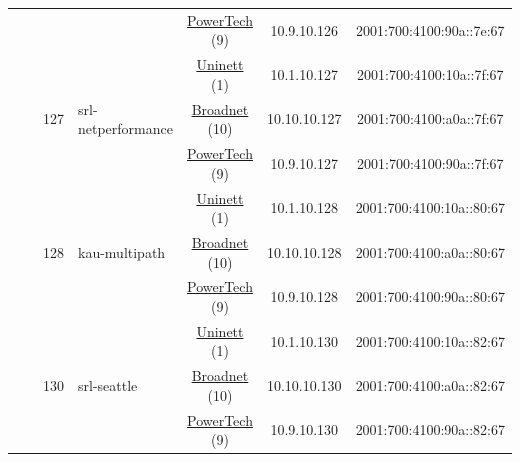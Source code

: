 \begin{small}
\begin{center}
\begin{longtable}{|c|c|c|c|c|c|c|c|}
  &  &  &  & \multicolumn{2}{|c|}{\tiny{\href{http://www.powertech.no}{PowerTech} (9)}} & \tiny{10.9.10.126} & \tiny{2001:700:4100:90a::7e:67} \\* \cline{3-3}\cline{4-4}\cline{5-5}\cline{6-6}\cline{7-7}\cline{8-8}
  &  & \multirow{3}{*}{\tiny{127}} & \multicolumn{1}{|l|}{\multirow{3}{*}{\tiny{srl-netperformance}}} & \multicolumn{2}{|c|}{\tiny{\href{https://www.uninett.no}{Uninett} (1)}} & \tiny{10.1.10.127} & \tiny{2001:700:4100:10a::7f:67} \\* \cline{5-5}\cline{6-6}\cline{7-7}\cline{8-8}
  &  &  &  & \multicolumn{2}{|c|}{\tiny{\href{https://www.broadnet.no}{Broadnet} (10)}} & \tiny{10.10.10.127} & \tiny{2001:700:4100:a0a::7f:67} \\* \cline{5-5}\cline{6-6}\cline{7-7}\cline{8-8}
  &  &  &  & \multicolumn{2}{|c|}{\tiny{\href{http://www.powertech.no}{PowerTech} (9)}} & \tiny{10.9.10.127} & \tiny{2001:700:4100:90a::7f:67} \\* \cline{3-3}\cline{4-4}\cline{5-5}\cline{6-6}\cline{7-7}\cline{8-8}
  &  & \multirow{3}{*}{\tiny{128}} & \multicolumn{1}{|l|}{\multirow{3}{*}{\tiny{kau-multipath}}} & \multicolumn{2}{|c|}{\tiny{\href{https://www.uninett.no}{Uninett} (1)}} & \tiny{10.1.10.128} & \tiny{2001:700:4100:10a::80:67} \\* \cline{5-5}\cline{6-6}\cline{7-7}\cline{8-8}
  &  &  &  & \multicolumn{2}{|c|}{\tiny{\href{https://www.broadnet.no}{Broadnet} (10)}} & \tiny{10.10.10.128} & \tiny{2001:700:4100:a0a::80:67} \\* \cline{5-5}\cline{6-6}\cline{7-7}\cline{8-8}
  &  &  &  & \multicolumn{2}{|c|}{\tiny{\href{http://www.powertech.no}{PowerTech} (9)}} & \tiny{10.9.10.128} & \tiny{2001:700:4100:90a::80:67} \\* \cline{3-3}\cline{4-4}\cline{5-5}\cline{6-6}\cline{7-7}\cline{8-8}
  &  & \multirow{3}{*}{\tiny{130}} & \multicolumn{1}{|l|}{\multirow{3}{*}{\tiny{srl-seattle}}} & \multicolumn{2}{|c|}{\tiny{\href{https://www.uninett.no}{Uninett} (1)}} & \tiny{10.1.10.130} & \tiny{2001:700:4100:10a::82:67} \\* \cline{5-5}\cline{6-6}\cline{7-7}\cline{8-8}
  &  &  &  & \multicolumn{2}{|c|}{\tiny{\href{https://www.broadnet.no}{Broadnet} (10)}} & \tiny{10.10.10.130} & \tiny{2001:700:4100:a0a::82:67} \\* \cline{5-5}\cline{6-6}\cline{7-7}\cline{8-8}
  &  &  &  & \multicolumn{2}{|c|}{\tiny{\href{http://www.powertech.no}{PowerTech} (9)}} & \tiny{10.9.10.130} & \tiny{2001:700:4100:90a::82:67} \\* \cline{3-3}\cline{4-4}\cline{5-5}\cline{6-6}\cline{7-7}\cline{8-8}

\end{longtable}
\end{center}
\end{small}

